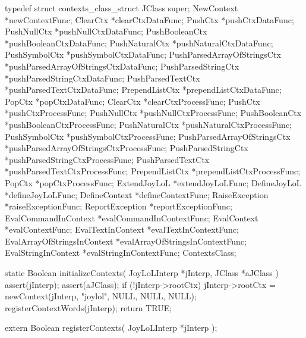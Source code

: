 \startTestSuite[registerContexts]

\startCHeader
typedef struct contexts_class_struct {
  JClass      super;
  NewContext     *newContextFunc;
  ClearCtx       *clearCtxDataFunc;
  PushCtx        *pushCtxDataFunc; 
  PushNullCtx    *pushNullCtxDataFunc;
  PushBooleanCtx *pushBooleanCtxDataFunc;
  PushNaturalCtx *pushNaturalCtxDataFunc;
  PushSymbolCtx  *pushSymbolCtxDataFunc;
  PushParsedArrayOfStringsCtx 
    *pushParsedArrayOfStringsCtxDataFunc;
  PushParsedStringCtx
    *pushParsedStringCtxDataFunc;
  PushParsedTextCtx
    *pushParsedTextCtxDataFunc;
  PrependListCtx *prependListCtxDataFunc;
  PopCtx         *popCtxDataFunc;
  ClearCtx       *clearCtxProcessFunc;
  PushCtx        *pushCtxProcessFunc;
  PushNullCtx    *pushNullCtxProcessFunc;
  PushBooleanCtx *pushBooleanCtxProcessFunc;
  PushNaturalCtx *pushNaturalCtxProcessFunc;
  PushSymbolCtx  *pushSymbolCtxProcessFunc;
  PushParsedArrayOfStringsCtx
    *pushParsedArrayOfStringsCtxProcessFunc;
  PushParsedStringCtx
    *pushParsedStringCtxProcessFunc;
  PushParsedTextCtx
    *pushParsedTextCtxProcessFunc;
  PrependListCtx *prependListCtxProcessFunc;
  PopCtx         *popCtxProcessFunc;
  ExtendJoyLoL   *extendJoyLoLFunc;
  DefineJoyLoL   *defineJoyLoLFunc;
  DefineContext  *defineContextFunc;
  RaiseException *raiseExceptionFunc;
  ReportException
    *reportExceptionFunc;
  EvalCommandInContext
    *evalCommandInContextFunc;
  EvalContext    *evalContextFunc;
  EvalTextInContext
    *evalTextInContextFunc;
  EvalArrayOfStringsInContext
    *evalArrayOfStringsInContextFunc;
  EvalStringInContext
    *evalStringInContextFunc;
} ContextsClass;
\stopCHeader

\startCCode
static Boolean initializeContexts(
  JoyLoLInterp *jInterp,
  JClass   *aJClass
) {
  assert(jInterp);
  assert(aJClass);
  if (!jInterp->rootCtx) {
    jInterp->rootCtx =
      newContext(jInterp, "joylol", NULL, NULL, NULL);
  }
  registerContextWords(jInterp);
  return TRUE;
}
\stopCCode

\startCHeader
extern Boolean registerContexts(
  JoyLoLInterp *jInterp
);
\stopCHeader
{}

